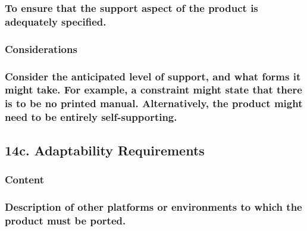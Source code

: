 \documentclass[
]{article}
\begin{document}
\hypertarget{to-ensure-that-the-support-aspect-of-the-product-is-adequately-specified.}{%
\subsubsection{\texorpdfstring{To ensure that the support aspect of the
product is adequately specified.
}{To ensure that the support aspect of the product is adequately specified. }}\label{to-ensure-that-the-support-aspect-of-the-product-is-adequately-specified.}}

\hypertarget{considerations-34}{%
\subsubsection{Considerations}\label{considerations-34}}

\hypertarget{consider-the-anticipated-level-of-support-and-what-forms-it-might-take.-for-example-a-constraint-might-state-that-there-is-to-be-no-printed-manual.-alternatively-the-product-might-need-to-be-entirely-self-supporting.}{%
\subsubsection{\texorpdfstring{Consider the anticipated level of
support, and what forms it might take. For example, a constraint might
state that there is to be no printed manual. Alternatively, the product
might need to be entirely self-supporting.
}{Consider the anticipated level of support, and what forms it might take. For example, a constraint might state that there is to be no printed manual. Alternatively, the product might need to be entirely self-supporting. }}\label{consider-the-anticipated-level-of-support-and-what-forms-it-might-take.-for-example-a-constraint-might-state-that-there-is-to-be-no-printed-manual.-alternatively-the-product-might-need-to-be-entirely-self-supporting.}}

\hypertarget{c.-adaptability-requirements}{%
\subsection{14c. Adaptability
Requirements}\label{c.-adaptability-requirements}}

\hypertarget{content-51}{%
\subsubsection{Content}\label{content-51}}

\hypertarget{description-of-other-platforms-or-environments-to-which-the-product-must-be-ported.}{%
\subsubsection{Description of other platforms or environments to which
the product must be
ported.}\label{description-of-other-platforms-or-environments-to-which-the-product-must-be-ported.}}
\end{document}
